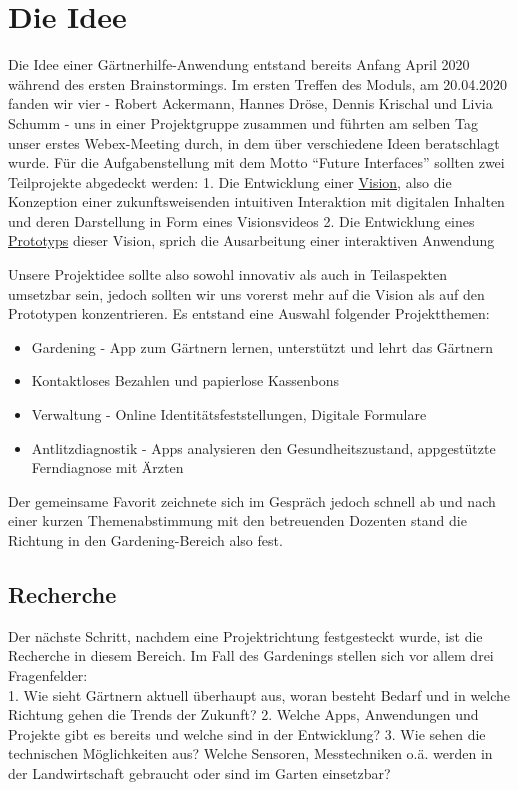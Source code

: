 \hypertarget{die-idee}{%
\section{Die Idee}\label{die-idee}}

Die Idee einer Gärtnerhilfe-Anwendung entstand bereits Anfang April 2020
während des ersten Brainstormings. Im ersten Treffen des Moduls, am
20.04.2020 fanden wir vier - Robert Ackermann, Hannes Dröse, Dennis
Krischal und Livia Schumm - uns in einer Projektgruppe zusammen und
führten am selben Tag unser erstes Webex-Meeting durch, in dem über
verschiedene Ideen beratschlagt wurde. Für die Aufgabenstellung mit dem
Motto ``Future Interfaces'' sollten zwei Teilprojekte abgedeckt werden:
1. Die Entwicklung einer \protect\hyperlink{vision}{Vision}, also die
Konzeption einer zukunftsweisenden intuitiven Interaktion mit digitalen
Inhalten und deren Darstellung in Form eines Visionsvideos 2. Die
Entwicklung eines \protect\hyperlink{prototyp}{Prototyps} dieser Vision,
sprich die Ausarbeitung einer interaktiven Anwendung

Unsere Projektidee sollte also sowohl innovativ als auch in Teilaspekten
umsetzbar sein, jedoch sollten wir uns vorerst mehr auf die Vision als
auf den Prototypen konzentrieren. Es entstand eine Auswahl folgender
Projektthemen:

\begin{itemize}
\tightlist
\item
  Gardening - App zum Gärtnern lernen, unterstützt und lehrt das
  Gärtnern
\item
  Kontaktloses Bezahlen und papierlose Kassenbons
\item
  Verwaltung - Online Identitätsfeststellungen, Digitale Formulare
\item
  Antlitzdiagnostik - Apps analysieren den Gesundheitszustand,
  appgestützte Ferndiagnose mit Ärzten
\end{itemize}

Der gemeinsame Favorit zeichnete sich im Gespräch jedoch schnell ab und
nach einer kurzen Themenabstimmung mit den betreuenden Dozenten stand
die Richtung in den Gardening-Bereich also fest.

\hypertarget{recherche}{%
\subsection{Recherche}\label{recherche}}

Der nächste Schritt, nachdem eine Projektrichtung festgesteckt wurde,
ist die Recherche in diesem Bereich. Im Fall des Gardenings stellen sich
vor allem drei Fragenfelder:\\
1. Wie sieht Gärtnern aktuell überhaupt aus, woran besteht Bedarf und in
welche Richtung gehen die Trends der Zukunft? 2. Welche Apps,
Anwendungen und Projekte gibt es bereits und welche sind in der
Entwicklung? 3. Wie sehen die technischen Möglichkeiten aus? Welche
Sensoren, Messtechniken o.ä. werden in der Landwirtschaft gebraucht oder
sind im Garten einsetzbar?

